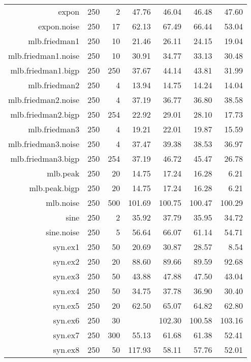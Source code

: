 \documentclass{bmcart}
\begin{document}
\begin{backmatter}
\begin{table}[pht]
\begin{tabular}{rrrrrrr}
  expon & 250 & 2 & 47.76 & 46.04 & 46.48 & 47.60 \\ 
  expon.noise & 250 & 17 & 62.13 & 67.49 & 66.44 & 53.04 \\ 
  mlb.friedman1 & 250 & 10 & 21.46 & 26.11 & 24.15 & 19.04 \\ 
  mlb.friedman1.noise & 250 & 10 & 30.91 & 34.77 & 33.13 & 30.48 \\ 
  mlb.friedman1.bigp & 250 & 250 & 37.67 & 44.14 & 43.81 & 31.99 \\ 
  mlb.friedman2 & 250 & 4 & 13.94 & 14.75 & 14.24 & 14.04 \\ 
  mlb.friedman2.noise & 250 & 4 & 37.19 & 36.77 & 36.80 & 38.58 \\ 
  mlb.friedman2.bigp & 250 & 254 & 22.92 & 29.01 & 28.10 & 17.73 \\ 
  mlb.friedman3 & 250 & 4 & 19.21 & 22.01 & 19.87 & 15.59 \\ 
  mlb.friedman3.noise & 250 & 4 & 37.47 & 39.38 & 38.53 & 36.97 \\ 
  mlb.friedman3.bigp & 250 & 254 & 37.19 & 46.72 & 45.47 & 26.78 \\ 
  mlb.peak & 250 & 20 & 14.75 & 17.24 & 16.28 & 6.21 \\ 
  mlb.peak.bigp & 250 & 20 & 14.75 & 17.24 & 16.28 & 6.21 \\ 
  mlb.noise & 250 & 500 & 101.69 & 100.75 & 100.47 & 100.29 \\ 
  sine & 250 & 2 & 35.92 & 37.79 & 35.95 & 34.72 \\ 
  sine.noise & 250 & 5 & 56.64 & 66.07 & 61.14 & 54.71 \\ 
  syn.ex1 & 250 & 50 & 20.69 & 30.87 & 28.57 & 8.54 \\ 
  syn.ex2 & 250 & 20 & 88.60 & 89.66 & 89.59 & 92.68 \\ 
  syn.ex3 & 250 & 50 & 43.88 & 47.88 & 47.50 & 43.04 \\ 
  syn.ex4 & 250 & 50 & 34.75 & 37.78 & 36.90 & 30.40 \\ 
  syn.ex5 & 250 & 20 & 62.50 & 65.07 & 64.82 & 62.80 \\ 
  syn.ex6 & 250 & 30 &  & 102.30 & 100.58 & 103.16 \\ 
  syn.ex7 & 250 & 300 & 55.13 & 61.68 & 61.38 & 52.41 \\ 
  syn.ex8 & 250 & 50 & 117.93 & 58.11 & 57.76 & 52.01 \\ 
  \cline{2-7}
\end{tabular}
\end{table}



\end{backmatter}
\end{document}
